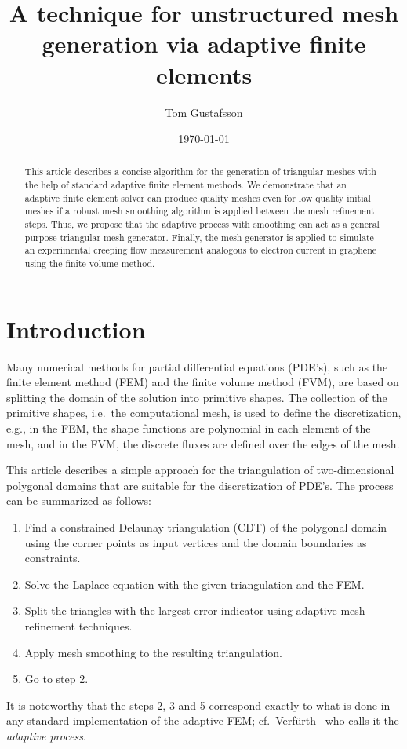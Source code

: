 \documentclass[11pt]{article}
\author{Tom Gustafsson}
\date{\today}
\title{A technique for unstructured mesh generation via adaptive finite elements}
\begin{document}
\newcommand*\DNA{\textsc{dna}}

\newcommand*\Let[2]{\State #1 $\gets$ #2}
\algrenewcommand{}
\algrenewcommand{}

\maketitle

\begin{abstract}
  This article describes a concise algorithm for the generation of triangular
  meshes with the help of standard adaptive finite element methods.  We
  demonstrate that an adaptive finite element solver can produce quality meshes
  even for low quality initial meshes if a robust mesh smoothing algorithm is
  applied between the mesh refinement steps.  Thus, we propose that the adaptive
  process with smoothing can act as a general purpose triangular mesh generator.
  Finally, the mesh generator is applied to simulate an experimental creeping
  flow measurement analogous to electron current in graphene using the finite
  volume method.
\end{abstract}

\section{Introduction}
\label{sec:orge4667b0}

Many numerical methods for partial differential equations (PDE's), such as the
finite element method (FEM) and the finite volume method (FVM), are based on
splitting the domain of the solution into primitive shapes.  The collection of
the primitive shapes, i.e.~the computational mesh, is used to define the
discretization, e.g., in the FEM, the shape functions are polynomial in each
element of the mesh, and in the FVM, the discrete fluxes are defined over the
edges of the mesh.

This article describes a simple approach for the triangulation of
two-dimensional polygonal domains that are suitable for the discretization of
PDE's.  The process can be summarized as follows:
\begin{enumerate}
\item Find a constrained Delaunay triangulation (CDT) of the polygonal domain
      using the corner points as input vertices and the domain boundaries
      as constraints.
\item Solve the Laplace equation with the given triangulation
      and the FEM.
\item Split
      the triangles with the largest error indicator
      using adaptive mesh refinement techniques.
\item Apply mesh smoothing to the resulting triangulation.
\item Go to step 2.
\end{enumerate}
It is noteworthy that the steps 2, 3 and 5 correspond exactly to what is done in
any standard implementation of the adaptive FEM;
cf.~Verfürth~\cite{Verf_rth_2013} who calls it the \emph{adaptive process}.
\end{document}
